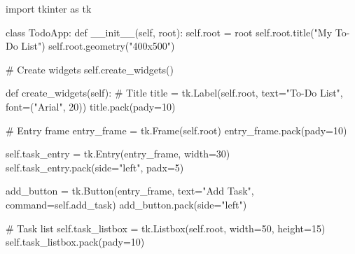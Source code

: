 \documentclass[
  letterpaper,
  DIV=11,
  numbers=noendperiod,
  oneside]{scrreprt}
\newenvironment{Shaded}{}{}
\newcommand{\CommentTok}[1]{\textcolor[rgb]{0.42,0.45,0.49}{#1}}
\newcommand{\DecValTok}[1]{\textcolor[rgb]{0.00,0.36,0.77}{#1}}
\newcommand{\FunctionTok}[1]{\textcolor[rgb]{0.44,0.26,0.76}{#1}}
\newcommand{\ImportTok}[1]{\textcolor[rgb]{0.01,0.18,0.38}{#1}}
\newcommand{\KeywordTok}[1]{\textcolor[rgb]{0.84,0.23,0.29}{#1}}
\newcommand{\NormalTok}[1]{\textcolor[rgb]{0.14,0.16,0.18}{#1}}
\newcommand{\OperatorTok}[1]{\textcolor[rgb]{0.14,0.16,0.18}{#1}}
\newcommand{\StringTok}[1]{\textcolor[rgb]{0.01,0.18,0.38}{#1}}
\newcommand{\VariableTok}[1]{\textcolor[rgb]{0.89,0.38,0.04}{#1}}
\begin{document}
\begin{Shaded}
\begin{Highlighting}[]
\ImportTok{import}\NormalTok{ tkinter }\ImportTok{as}\NormalTok{ tk}

\KeywordTok{class}\NormalTok{ TodoApp:}
    \KeywordTok{def} \FunctionTok{\_\_init\_\_}\NormalTok{(}\VariableTok{self}\NormalTok{, root):}
        \VariableTok{self}\NormalTok{.root }\OperatorTok{=}\NormalTok{ root}
        \VariableTok{self}\NormalTok{.root.title(}\StringTok{"My To{-}Do List"}\NormalTok{)}
        \VariableTok{self}\NormalTok{.root.geometry(}\StringTok{"400x500"}\NormalTok{)}
        
        \CommentTok{\# Create widgets}
        \VariableTok{self}\NormalTok{.create\_widgets()}
        
    \KeywordTok{def}\NormalTok{ create\_widgets(}\VariableTok{self}\NormalTok{):}
        \CommentTok{\# Title}
\NormalTok{        title }\OperatorTok{=}\NormalTok{ tk.Label(}\VariableTok{self}\NormalTok{.root, text}\OperatorTok{=}\StringTok{"To{-}Do List"}\NormalTok{, font}\OperatorTok{=}\NormalTok{(}\StringTok{"Arial"}\NormalTok{, }\DecValTok{20}\NormalTok{))}
\NormalTok{        title.pack(pady}\OperatorTok{=}\DecValTok{10}\NormalTok{)}
        
        \CommentTok{\# Entry frame}
\NormalTok{        entry\_frame }\OperatorTok{=}\NormalTok{ tk.Frame(}\VariableTok{self}\NormalTok{.root)}
\NormalTok{        entry\_frame.pack(pady}\OperatorTok{=}\DecValTok{10}\NormalTok{)}
        
        \VariableTok{self}\NormalTok{.task\_entry }\OperatorTok{=}\NormalTok{ tk.Entry(entry\_frame, width}\OperatorTok{=}\DecValTok{30}\NormalTok{)}
        \VariableTok{self}\NormalTok{.task\_entry.pack(side}\OperatorTok{=}\StringTok{"left"}\NormalTok{, padx}\OperatorTok{=}\DecValTok{5}\NormalTok{)}
        
\NormalTok{        add\_button }\OperatorTok{=}\NormalTok{ tk.Button(entry\_frame, text}\OperatorTok{=}\StringTok{"Add Task"}\NormalTok{, command}\OperatorTok{=}\VariableTok{self}\NormalTok{.add\_task)}
\NormalTok{        add\_button.pack(side}\OperatorTok{=}\StringTok{"left"}\NormalTok{)}
        
        \CommentTok{\# Task list}
        \VariableTok{self}\NormalTok{.task\_listbox }\OperatorTok{=}\NormalTok{ tk.Listbox(}\VariableTok{self}\NormalTok{.root, width}\OperatorTok{=}\DecValTok{50}\NormalTok{, height}\OperatorTok{=}\DecValTok{15}\NormalTok{)}
        \VariableTok{self}\NormalTok{.task\_listbox.pack(pady}\OperatorTok{=}\DecValTok{10}\NormalTok{)}
        

\end{Highlighting}
\end{Shaded}
\end{document}
